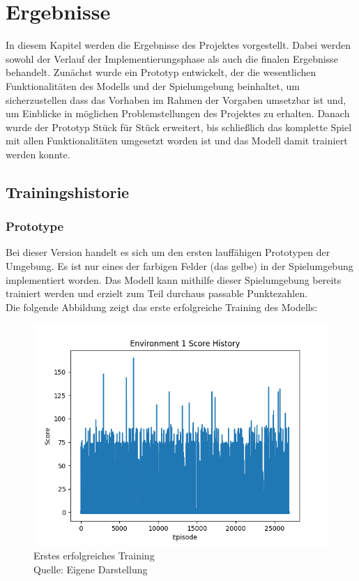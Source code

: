 \section{Ergebnisse}
In diesem Kapitel werden die Ergebnisse des Projektes vorgestellt. Dabei werden sowohl der Verlauf der Implementierungsphase als auch die finalen Ergebnisse behandelt. Zunächst wurde ein Prototyp entwickelt, der die wesentlichen Funktionalitäten des Modells und der Spielumgebung beinhaltet, um sicherzustellen dass das Vorhaben im Rahmen der Vorgaben umsetzbar ist und, um Einblicke in möglichen Problemstellungen des Projektes zu erhalten. Danach wurde der Prototyp Stück für Stück erweitert, bis schließlich das komplette Spiel mit allen Funktionalitäten umgesetzt worden ist und das Modell damit trainiert werden konnte.
\subsection{Trainingshistorie}
\subsubsection{Prototype}
Bei dieser Version handelt es sich um den ersten lauffähigen Prototypen der Umgebung. Es ist nur eines der farbigen Felder (das gelbe) in der Spielumgebung implementiert worden. Das Modell kann mithilfe dieser Spielumgebung bereits trainiert werden und erzielt zum Teil durchaus passable Punktezahlen.\\

Die folgende Abbildung zeigt das erste erfolgreiche Training des Modells:
\nopagebreak
\begin{figure}[H]
	\includegraphics[width=1\textwidth]{Bilder/firstpropertraining} 
	\caption[Erstes erfolgreiches Training]{Erstes erfolgreiches Training\\ Quelle: Eigene Darstellung}
\end{figure}


